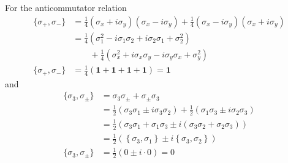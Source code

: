 \documentclass[../../../main.tex]{subfiles}
\begin{document}
For the anticommutator relation
\begin{align*}
    \{\sigma_{+}, \sigma_{-}\}
     & = \frac{1}{4}(\sigma_{x} + i \sigma_{y})(\sigma_{x} - i \sigma_{y}) + \frac{1}{4}(\sigma_{x} - i \sigma_{y})(\sigma_{x} + i \sigma_{y}) \\
     & =  \frac{1}{4} \left( \sigma_1 ^2- i \sigma_1 \sigma_2 + i \sigma_2 \sigma_1  + \sigma_2^2 \right)                                      \\
     & \qquad + \frac{1}{4} \left( \sigma_{x}^{2} + i \sigma_{x} \sigma_{y} - i \sigma_{y} \sigma_{x} + \sigma_{y}^{2} \right)                 \\
    \{\sigma_{+}, \sigma_{-}\}
     & = \frac{1 }{4 }\left( \mathbf{1}+\mathbf{1}+\mathbf{1}+\mathbf{1} \right) = \mathbf{1}
\end{align*}
and
\begin{align*}
    \{ \sigma_3, \sigma_\pm \}
     & =  \sigma_3 \sigma_\pm + \sigma_\pm \sigma_3                                                                        \\
     & = \frac{1}{2} (\sigma_3 \sigma_1 \pm i \sigma_3 \sigma_2) + \frac{1}{2} (\sigma_1 \sigma_3 \pm i \sigma_2 \sigma_3) \\
     & =  \frac{1}{2} (\sigma_3 \sigma_1 + \sigma_1 \sigma_3 \pm i (\sigma_3 \sigma_2 + \sigma_2 \sigma_3))                \\
     & = \frac{1 }{2 }\left( \left\{ \sigma_3,\sigma_1 \right\}\pm i \left\{ \sigma_3,\sigma_2 \right\}   \right)          \\
    \{ \sigma_3, \sigma_{\pm} \}
     & =   \frac{1}{2} (0 \pm i \cdot 0) = 0
\end{align*}
\end{document}
